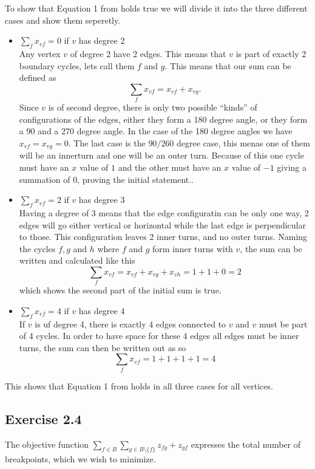 To show that Equation 1 from \cite{assignment1} holds true we will divide it
into the three different cases and show them seperetly.
\begin{itemize}
\item $\sum_f x_{vf} = 0$ if $v$ has degree 2 \\
  Any vertex $v$ of degree 2 have 2 edges. This means that $v$ is part of
  exactly 2 boundary cycles, lets call them $f$ and $g$. This means that our sum
  can be defined as
  \[
    \sum_f x_{vf} = x_{vf} + x_{vg}.
  \]
  Since $v$ is of second degree, there is only two possible ``kinds'' of
  configurations of the edges, either they form a 180 degree angle, or they form
  a 90 and a 270 degree angle.  In the case of the 180 degree angles we have
  $x_{vf} = x_{vg} = 0$. The last case is the $90/260$ degree case, this menas
  one of them will be an innerturn and one will be an outer turn. Because of
  this one cycle must have an $x$ value of $1$ and the other must have an $x$
  value of $-1$ giving a summation of 0, proving the initial statement..
\item $\sum_f x_{vf} = 2$ if $v$ has degree 3 \\
  Having a degree of 3 means that the edge configuratin can be only one way, 2
  edges will go either vertical or horizontal while the last edge is
  perpendicular to those. This configuration leaves 2 inner turns, and no outer
  turns. Naming the cycles $f, g$ and $h$ where $f$ and $g$ form inner turns
  with $v$, the sum can be written and calculated like this
  \[
    \sum_f x_{vf} = x_{vf} + x_{vg} + x_{vh} = 1 + 1 + 0 = 2
  \]
  which shows the second part of the initial sum is true.

\item $\sum_f x_{vf} = 4$ if $v$ has degree 4 \\
  If $v$ is uf degree 4, there is exactly 4 edges connected to $v$ and $v$ must
  be part of 4 cycles. In order to have space for these 4 edges all edges must
  be inner turns, the sum can then be written out as so
  \[
    \sum_f x_{vf} = 1 + 1 + 1 + 1 = 4
  \]
\end{itemize}
%
This shows that Equation 1 from \cite{assignment1} holds in all three cases for
all vertices.
%
\subsection{Exercise 2.4}
%
The objective function $\sum_{f\in B} \sum_{g\in B\setminus\{f\}} z_{fg} + z_{gf}$
expresses the total number of breakpoints, which we wish to minimize.

